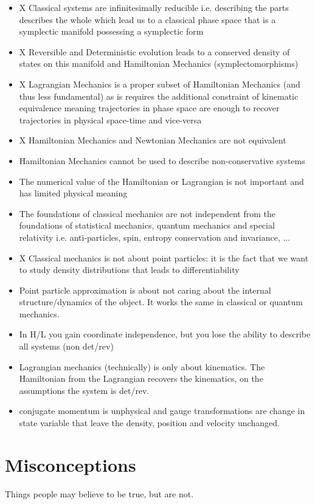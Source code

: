 \documentclass{article}
\begin{document}
\begin{itemize}
	\item  X Classical systems are infinitesimally reducible i.e. describing the parts describes the whole which lead us to a classical phase space that is a symplectic manifold possessing a symplectic form
	\item X Reversible and Deterministic evolution leads to a conserved density of states on this manifold and Hamiltonian Mechanics (symplectomorphisms) 
	\item X Lagrangian Mechanics is a proper subset of Hamiltonian Mechanics (and thus less fundamental) as is requires the additional constraint of kinematic equivalence meaning trajectories in phase space are enough to recover trajectories in physical space-time and vice-versa
	\item X Hamiltonian Mechanics and Newtonian Mechanics are not equivalent
	\item Hamiltonian Mechanics cannot be used to describe non-conservative systems
	\item The numerical value of the Hamiltonian or Lagrangian is not important and has limited physical meaning
	\item The foundations of classical mechanics are not independent from the foundations of statistical mechanics, quantum mechanics and special relativity i.e. anti-particles, spin, entropy conservation and invariance, ...
	\item X Classical mechanics is not about point particles: it is the fact that we want to study density distributions that leads to differentiability
	\item Point particle approximation is about not caring about the internal structure/dynamics of the object. It works the same in classical or quantum mechanics.
	\item In H/L you gain coordinate independence, but you lose the ability to describe all systems (non det/rev)
	\item Lagrangian mechanics (technically) is only about kinematics. The Hamiltonian from the Lagrangian recovers the kinematics, on the assumptions the system is det/rev.
	\item conjugate momentum is unphysical and gauge transformations are change in state variable that leave the density, position and velocity unchanged.
\end{itemize}


\section{Misconceptions}
Things people may believe to be true, but are not.
\end{document}
